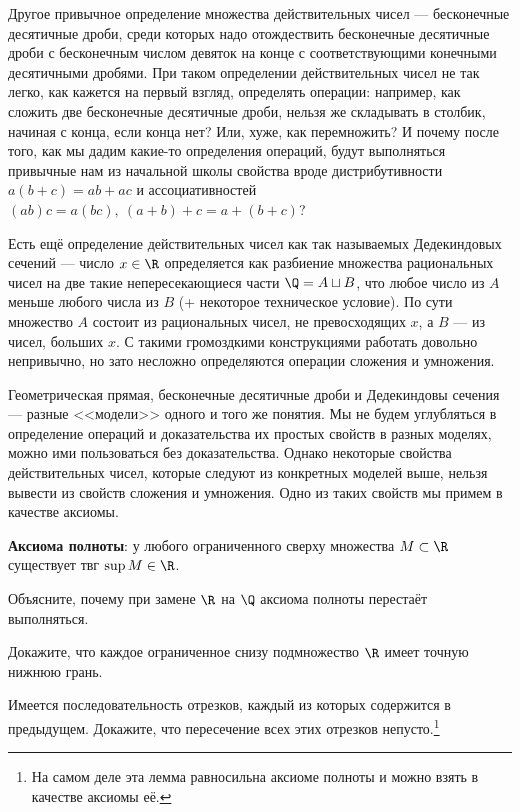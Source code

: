\documentclass[a4paper, 12pt, num=2729, date=01.09.2020]{listok}
\begin{document}
Другое привычное определение множества действительных чисел --- бесконечные десятичные дроби, среди которых надо отождествить бесконечные десятичные дроби с бесконечным числом девяток на конце с соответствующими конечными десятичными дробями. При таком определении действительных чисел не так легко, как кажется на первый взгляд, определять операции: например, как сложить две бесконечные десятичные дроби, нельзя же складывать в столбик, начиная с конца, если конца нет? Или, хуже, как перемножить? И почему после того, как мы дадим какие-то определения операций, будут выполняться привычные нам из начальной школы свойства вроде дистрибутивности $a(b + c) = ab + ac$ и ассоциативностей $(ab)c = a(bc), \ (a + b) + c = a + (b + c)$? 

Есть ещё определение действительных чисел как так называемых Дедекиндовых сечений --- число $x \in \R$ определяется как разбиение множества рациональных чисел на две такие непересекающиеся части $\Q = A \sqcup B$, что любое число из $A$ меньше любого числа из $B$ (+ некоторое техническое условие). По сути множество $A$ состоит из рациональных чисел, не превосходящих $x$, а $B$ --- из чисел, больших $x$. С такими громоздкими конструкциями работать довольно непривычно, но зато несложно определяются операции сложения и умножения.

Геометрическая прямая, бесконечные десятичные дроби и Дедекиндовы сечения --- разные <<модели>> одного и того же понятия. Мы не будем углубляться в определение операций и доказательства их простых свойств в разных моделях, можно ими пользоваться без доказательства. Однако некоторые свойства действительных чисел, которые следуют из конкретных моделей выше, нельзя вывести из свойств сложения и умножения. Одно из таких свойств мы примем в качестве аксиомы. 

\smallskip

\noindent\textbf{Аксиома полноты}: у любого ограниченного сверху множества $M \subset \R$ существует твг $\sup M \in \R$. 

\begin{problem}
    Объясните, почему при замене $\R$ на $\Q$ аксиома полноты перестаёт выполняться. 
\end{problem}

\begin{problem}
    Докажите, что каждое ограниченное снизу подмножество $\R$ имеет точную нижнюю грань. 
\end{problem}

\begin{problem}\label{subsec}
    Имеется последовательность отрезков, каждый из которых содержится в предыдущем.
    Докажите, что пересечение всех этих отрезков непусто.\footnote{На самом деле эта лемма равносильна аксиоме полноты и можно взять в качестве аксиомы её.}
\end{problem}
\end{document}
